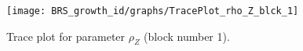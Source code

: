 \begin{figure}[H]
\centering
  \texttt{[image: BRS\_growth\_id/graphs/TracePlot\_rho\_Z\_blck\_1]}\\
    \caption{Trace plot for parameter ${\rho_Z}$ (block number 1).}
\end{figure}
